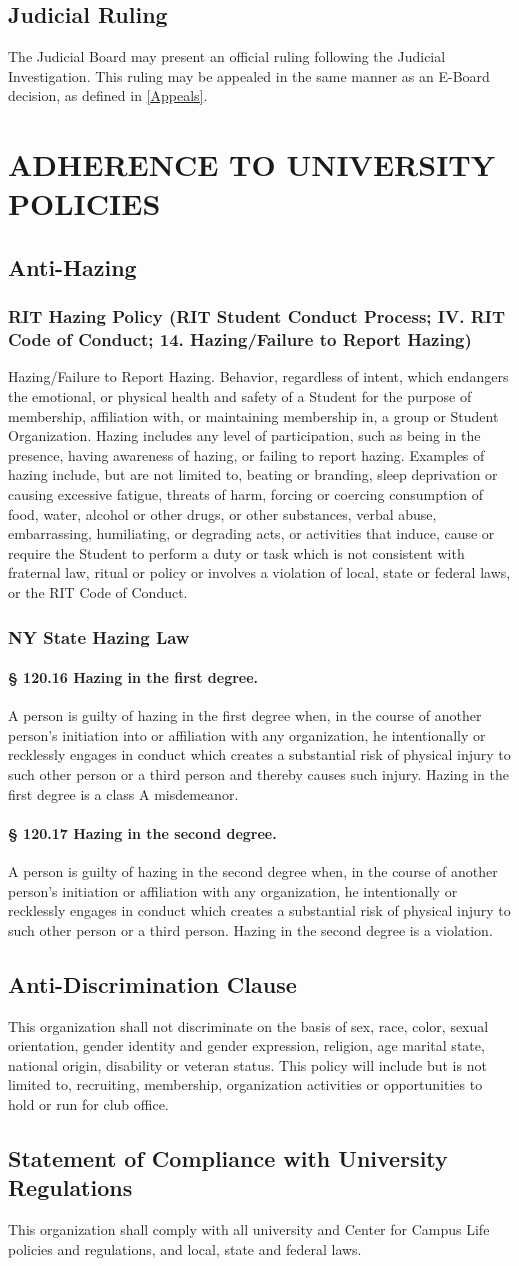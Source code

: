 \documentclass{article}
\newcommand{\article}[1]{\section{#1} \label{#1}}
\newcommand{\asection}[1]{\subsection{#1} \label{#1}}
\newcommand{\asubsection}[1]{\subsubsection{#1} \label{#1}}
\newcommand{\asubsubsection}[1]{\paragraph{#1} \label{#1}}
\begin{document}
\asection{Judicial Ruling}
The Judicial Board may present an official ruling following the Judicial Investigation.
This ruling may be appealed in the same manner as an E-Board decision, as defined in \ref{Appeals}.

\article{ADHERENCE TO UNIVERSITY POLICIES}

\asection{Anti-Hazing}

\asubsection{RIT Hazing Policy (RIT Student Conduct Process; IV. RIT Code of Conduct; 14. Hazing/Failure to Report Hazing)}
Hazing/Failure to Report Hazing.
Behavior, regardless of intent, which endangers the emotional, or physical health and safety of a Student for the purpose of membership, affiliation with, or maintaining membership in, a group or Student Organization.
Hazing includes any level of participation, such as being in the presence, having awareness of hazing, or failing to report hazing.
Examples of hazing include, but are not limited to, beating or branding, sleep deprivation or causing excessive fatigue, threats of harm, forcing or coercing consumption of food, water, alcohol or other drugs, or other substances, verbal abuse, embarrassing, humiliating, or degrading acts, or activities that induce, cause or require the Student to perform a duty or task which is not consistent with fraternal law, ritual or policy or involves a violation of local, state or federal laws, or the RIT Code of Conduct.

\asubsection{NY State Hazing Law}

\asubsubsection{§ 120.16 Hazing in the first degree.}
A person is guilty of hazing in the first degree when, in the course of another person's initiation into or affiliation with any organization, he intentionally or recklessly engages in conduct which creates a substantial risk of physical injury to such other person or a third person and thereby causes such injury.
Hazing in the first degree is a class A misdemeanor.

\asubsubsection{§ 120.17 Hazing in the second degree.}
A person is guilty of hazing in the second degree when, in the course of another person's initiation or affiliation with any organization, he intentionally or recklessly engages in conduct which creates a substantial risk of physical injury to such other person or a third person.
Hazing in the second degree is a violation.

\asection{Anti-Discrimination Clause}
This organization shall not discriminate on the basis of sex, race, color, sexual orientation, gender identity and gender expression, religion, age marital state, national origin, disability or veteran status.
This policy will include but is not limited to, recruiting, membership, organization activities or opportunities to hold or run for club office.

\asection{Statement of Compliance with University Regulations}
This organization shall comply with all university and Center for Campus Life policies and regulations, and local, state and federal laws.
\end{document}
